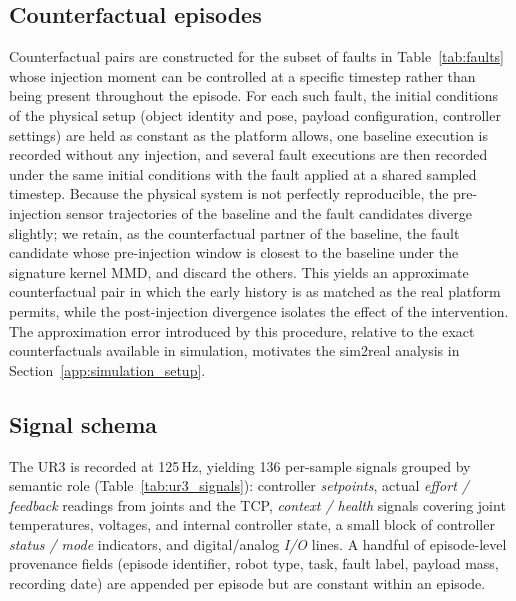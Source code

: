 \subsection{Counterfactual episodes}

Counterfactual pairs are constructed for the subset of faults in Table~\ref{tab:faults} whose injection moment can be controlled at a specific timestep rather than being present throughout the episode. For each such fault, the initial conditions of the physical setup (object identity and pose, payload configuration, controller settings) are held as constant as the platform allows, one baseline execution is recorded without any injection, and several fault executions are then recorded under the same initial conditions with the fault applied at a shared sampled timestep. Because the physical system is not perfectly reproducible, the pre-injection sensor trajectories of the baseline and the fault candidates diverge slightly; we retain, as the counterfactual partner of the baseline, the fault candidate whose pre-injection window is closest to the baseline under the signature kernel MMD, and discard the others. This yields an approximate counterfactual pair in which the early history is as matched as the real platform permits, while the post-injection divergence isolates the effect of the intervention. The approximation error introduced by this procedure, relative to the exact counterfactuals available in simulation, motivates the sim2real analysis in Section~\ref{app:simulation_setup}.


\subsection{Signal schema}

The UR3 is recorded at 125\,Hz, yielding 136 per-sample signals grouped by semantic role (Table~\ref{tab:ur3_signals}): controller \emph{setpoints}, actual \emph{effort / feedback} readings from joints and the TCP, \emph{context / health} signals covering joint temperatures, voltages, and internal controller state, a small block of controller \emph{status / mode} indicators, and digital/analog \emph{I/O} lines. A handful of episode-level provenance fields (episode identifier, robot type, task, fault label, payload mass, recording date) are appended per episode but are constant within an episode.

